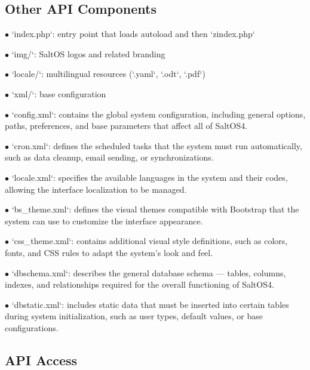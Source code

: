 \documentclass[a4paper]{article}
\begin{document}
\hypertarget{toc11}{}
\subsection{Other API Components}

\begin{compactitem}
\item[\color{myblue}$\bullet$] `index.php`: entry point that loads autoload and then `zindex.php`
\item[\color{myblue}$\bullet$] `img/`: SaltOS logos and related branding
\item[\color{myblue}$\bullet$] `locale/`: multilingual resources (`.yaml`, `.odt`, `.pdf`)
\item[\color{myblue}$\bullet$] `xml/`: base configuration
  \begin{compactitem}
  \item[\color{myblue}$\bullet$] `config.xml`: contains the global system configuration, including general options, paths, preferences, and base parameters that affect all of SaltOS4.
  \item[\color{myblue}$\bullet$] `cron.xml`: defines the scheduled tasks that the system must run automatically, such as data cleanup, email sending, or synchronizations.
  \item[\color{myblue}$\bullet$] `locale.xml`: specifies the available languages in the system and their codes, allowing the interface localization to be managed.
  \item[\color{myblue}$\bullet$] `bs\_theme.xml`: defines the visual themes compatible with Bootstrap that the system can use to customize the interface appearance.
  \item[\color{myblue}$\bullet$] `css\_theme.xml`: contains additional visual style definitions, such as colors, fonts, and CSS rules to adapt the system's look and feel.
  \item[\color{myblue}$\bullet$] `dbschema.xml`: describes the general database schema — tables, columns, indexes, and relationships required for the overall functioning of SaltOS4.
  \item[\color{myblue}$\bullet$] `dbstatic.xml`: includes static data that must be inserted into certain tables during system initialization, such as user types, default values, or base configurations.
  \end{compactitem}
\end{compactitem}

\hypertarget{toc12}{}
\subsection{API Access}
\end{document}
